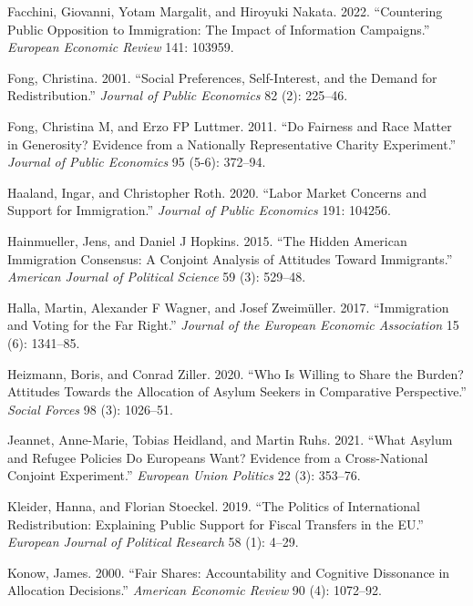\documentclass[
  12pt,
  a4paper,
]{article}
\newlength{\cslhangindent}
\newenvironment{CSLReferences}[2] %
 {\begin{list}{}{%
  \setlength{\itemindent}{0pt}
  \setlength{\leftmargin}{0pt}
  \setlength{\parsep}{0pt}
  \ifodd #1
   \setlength{\leftmargin}{\cslhangindent}
   \setlength{\itemindent}{-1\cslhangindent}
  \fi
  \setlength{\itemsep}{#2\baselineskip}}}
 {\end{list}}
\begin{document}
\begin{CSLReferences}{1}{0}
Facchini, Giovanni, Yotam Margalit, and Hiroyuki Nakata. 2022. {``Countering Public Opposition to Immigration: The Impact of Information Campaigns.''} \emph{European Economic Review} 141: 103959.

Fong, Christina. 2001. {``Social Preferences, Self-Interest, and the Demand for Redistribution.''} \emph{Journal of Public Economics} 82 (2): 225--46.

Fong, Christina M, and Erzo FP Luttmer. 2011. {``Do Fairness and Race Matter in Generosity? Evidence from a Nationally Representative Charity Experiment.''} \emph{Journal of Public Economics} 95 (5-6): 372--94.

Haaland, Ingar, and Christopher Roth. 2020. {``Labor Market Concerns and Support for Immigration.''} \emph{Journal of Public Economics} 191: 104256.

Hainmueller, Jens, and Daniel J Hopkins. 2015. {``The Hidden American Immigration Consensus: A Conjoint Analysis of Attitudes Toward Immigrants.''} \emph{American Journal of Political Science} 59 (3): 529--48.

Halla, Martin, Alexander F Wagner, and Josef Zweimüller. 2017. {``Immigration and Voting for the Far Right.''} \emph{Journal of the European Economic Association} 15 (6): 1341--85.

Heizmann, Boris, and Conrad Ziller. 2020. {``Who Is Willing to Share the Burden? Attitudes Towards the Allocation of Asylum Seekers in Comparative Perspective.''} \emph{Social Forces} 98 (3): 1026--51.

Jeannet, Anne-Marie, Tobias Heidland, and Martin Ruhs. 2021. {``What Asylum and Refugee Policies Do Europeans Want? Evidence from a Cross-National Conjoint Experiment.''} \emph{European Union Politics} 22 (3): 353--76.

Kleider, Hanna, and Florian Stoeckel. 2019. {``The Politics of International Redistribution: Explaining Public Support for Fiscal Transfers in the EU.''} \emph{European Journal of Political Research} 58 (1): 4--29.

Konow, James. 2000. {``Fair Shares: Accountability and Cognitive Dissonance in Allocation Decisions.''} \emph{American Economic Review} 90 (4): 1072--92.


\end{CSLReferences}
\end{document}
